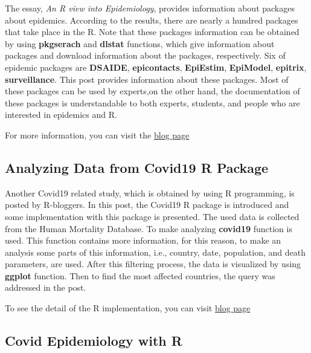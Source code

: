 \documentclass[
]{article}
\begin{document}
The essay, \emph{An R view into Epidemiology}, provides information
about packages about epidemics. According to the results, there are
nearly a hundred packages that take place in the R. Note that these
packages information can be obtained by using \textbf{pkgserach} and
\textbf{dlstat} functions, which give information about packages and
download information about the packages, respectively. Six of epidemic
packages are \textbf{DSAIDE}, \textbf{epicontacts}, \textbf{EpiEstim},
\textbf{EpiModel}, \textbf{epitrix}, \textbf{surveillance}. This post
provides information about these packages. Most of these packages can be
used by experts,on the other hand, the documentation of these packages
is understandable to both experts, students, and people who are
interested in epidemics and R.

For more information, you can visit the
\href{https://rviews.rstudio.com/2020/05/20/some-r-resources-for-epidemiology/}{blog
page}

\hypertarget{analyzing-data-from-covid19-r-package}{%
\subsection{Analyzing Data from Covid19 R
Package}\label{analyzing-data-from-covid19-r-package}}

Another Covid19 related study, which is obtained by using R programming,
is posted by R-bloggers. In this post, the Covid19 R package is
introduced and some implementation with this package is presented. The
used data is collected from the Human Mortality Database. To make
analyzing \textbf{covid19} function is used. This function contains more
information, for this reason, to make an analysis some parts of this
information, i.e., country, date, population, and death parameters, are
used. After this filtering process, the data is visualized by using
\textbf{ggplot} function. Then to find the most affected countries, the
query was addressed in the post.

To see the detail of the R implementation, you can visit
\href{https://www.r-bloggers.com/analyzing-data-from-covid19-r-package/}{blog
page}

\hypertarget{covid-epidemiology-with-r}{%
\subsection{Covid Epidemiology with R}\label{covid-epidemiology-with-r}}
\end{document}
